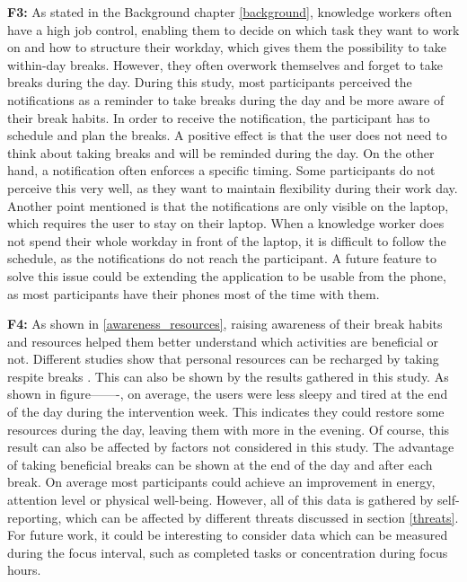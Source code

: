 \documentclass{hasel_thesis}
\begin{document}
\textbf{F3:} As stated in the Background chapter \ref{background}, knowledge workers often have a high job control, enabling them to decide on which task they want to work on and how to structure their workday, which gives them the possibility to take within-day breaks. However, they often overwork themselves and forget to take breaks during the day. During this study, most participants perceived the notifications as a reminder to take breaks during the day and be more aware of their break habits. In order to receive the notification, the participant has to schedule and plan the breaks. A positive effect is that the user does not need to think about taking breaks and will be reminded during the day. On the other hand, a notification often enforces a specific timing. Some participants do not perceive this very well, as they want to maintain flexibility during their work day. Another point mentioned is that the notifications are only visible on the laptop, which requires the user to stay on their laptop. When a knowledge worker does not spend their whole workday in front of the laptop, it is difficult to follow the schedule, as the notifications do not reach the participant. A future feature to solve this issue could be extending the application to be usable from the phone, as most participants have their phones most of the time with them.

\textbf{F4:} As shown in \ref{awareness_resources}, raising awareness of their break habits and resources helped them better understand which activities are beneficial or not. Different studies show that personal resources can be recharged by taking respite breaks \cite{Trougakos.2009}. This can also be shown by the results gathered in this study. As shown in figure-------, on average, the users were less sleepy and tired at the end of the day during the intervention week. This indicates they could restore some resources during the day, leaving them with more in the evening. Of course, this result can also be affected by factors not considered in this study. The advantage of taking beneficial breaks can be shown at the end of the day and after each break. On average most participants could achieve an improvement in energy, attention level or physical well-being. However, all of this data is gathered by self-reporting, which can be affected by different threats discussed in section \ref{threats}. For future work, it could be interesting to consider data which can be measured during the focus interval, such as completed tasks or concentration during focus hours.
\end{document}
